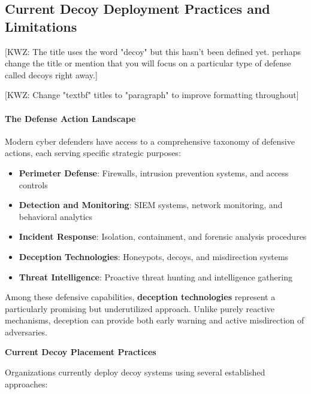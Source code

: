 \documentclass[12pt,oneside]{article}
\newcommand{\kwz}[1]{
  {\color{magenta} [KWZ: {#1}]}
 }
\begin{document}
\subsection{Current Decoy Deployment Practices and Limitations}

\kwz{The title uses the word "decoy" but this hasn't been defined yet. perhaps change the title or mention that you will focus on a particular type of defense called decoys right away.}

\kwz{Change "textbf" titles to "paragraph" to improve formatting throughout}
\paragraph{The Defense Action Landscape}


Modern cyber defenders have access to a comprehensive taxonomy of defensive actions, each serving specific strategic purposes:

\begin{itemize}
    \item \textbf{Perimeter Defense}: Firewalls, intrusion prevention systems, and access controls
    \item \textbf{Detection and Monitoring}: SIEM systems, network monitoring, and behavioral analytics
    \item \textbf{Incident Response}: Isolation, containment, and forensic analysis procedures
    \item \textbf{Deception Technologies}: Honeypots, decoys, and misdirection systems
    \item \textbf{Threat Intelligence}: Proactive threat hunting and intelligence gathering
\end{itemize}

Among these defensive capabilities, \textbf{deception technologies} represent a particularly promising but underutilized approach. Unlike purely reactive mechanisms, deception can provide both early warning and active misdirection of adversaries.

\textbf{Current Decoy Placement Practices}

Organizations currently deploy decoy systems using several established approaches:
\end{document}
